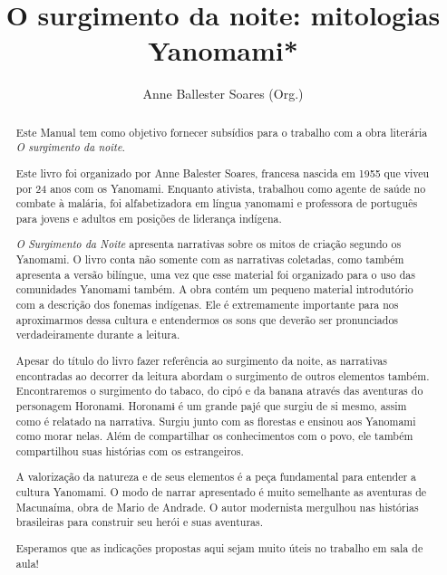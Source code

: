 \documentclass[12pt]{extarticle}
\begin{document}
\newcommand{\AutorLivro}{Anne Ballester Soares (Org.)}
\newcommand{\TituloLivro}{O surgimento da noite: mitologias Yanomami*}
\newcommand{\Tema}{Ficção, mistério e fantasia}
\newcommand{\Genero}{Mitologia indígena}
\newcommand{\imagemCapa}{./images/PNLD0029-01.png}
\newcommand{\issnppub}{---}
\newcommand{\issnepub}{---}
\newcommand{\colaborador}{\textbf{Fulano de Tal} é uma pessoa incrível e vai fazer um bom serviço.}


\title{\TituloLivro}
\author{\AutorLivro}
\def\authornotes{\colaborador}

\date{}
\maketitle




\begin{abstract}
Este Manual tem como objetivo fornecer subsídios para o trabalho com a
obra literária \emph{O surgimento da noite.}

Este livro foi organizado por Anne Balester Soares, francesa nascida em 1955 
que viveu por 24 anos com os Yanomami.  Enquanto ativista, trabalhou como agente 
de saúde no combate à malária, foi alfabetizadora em língua yanomami e professora 
de português para jovens e adultos em posições de liderança indígena.

\emph{O Surgimento da Noite} apresenta narrativas sobre os mitos de criação segundo 
os Yanomami. O livro conta não somente com as narrativas coletadas, como também 
apresenta a versão bilíngue, uma vez que esse material foi organizado para o uso 
das comunidades Yanomami também. A obra contém um pequeno material introdutório 
com a descrição dos fonemas indígenas. Ele é extremamente importante para nos 
aproximarmos dessa cultura e entendermos os sons que deverão ser pronunciados 
verdadeiramente durante a leitura. 

Apesar do título do livro fazer referência ao surgimento da noite, as narrativas
encontradas ao decorrer da leitura abordam o surgimento de outros elementos
também. Encontraremos o surgimento do tabaco, do cipó e da banana através
das aventuras do personagem Horonamɨ. Horonamɨ é um grande pajé que surgiu de si mesmo, 
assim como é relatado na narrativa. Surgiu junto com as florestas e ensinou aos Yanomami 
como morar nelas. Além de compartilhar os conhecimentos com o povo, ele também
compartilhou suas histórias com os estrangeiros.

A valorização da natureza e de seus elementos é a peça fundamental para entender 
a cultura Yanomami. O modo de narrar apresentado é muito semelhante as aventuras 
de Macunaíma, obra de Mario de Andrade. O autor modernista mergulhou nas histórias 
brasileiras para construir seu herói e suas aventuras.

Esperamos que as indicações propostas aqui sejam muito úteis no trabalho em
sala de aula! 


\end{abstract}
\end{document}

